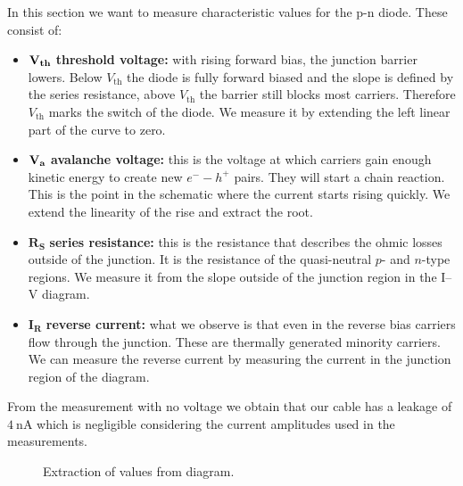 In this section we want to measure characteristic values for the p-n diode. These consist of:

\begin{itemize}
  \item $\mathbf{V_\mathrm{\bf{th}}}$ \textbf{threshold voltage:} with rising forward bias, the junction barrier lowers. Below $V_\mathrm{th}$ the diode is fully forward biased and the slope is defined by the series resistance, above $V_\mathrm{th}$ the barrier still blocks most carriers. Therefore $V_\mathrm{th}$ marks the switch of the diode.
  We measure it by extending the left linear part of the curve to zero.
  \item $\mathbf{V_\mathrm{\bf{a}}}$ \textbf{avalanche voltage:} this is the voltage at which carriers gain enough kinetic energy to create new $e^- - h^+$ pairs. They will start a chain reaction. This is the point in the schematic where the current starts rising quickly. We extend the linearity of the rise and extract the root.

  \item $\mathbf{R_S}$ \textbf{series resistance:} this is the resistance that describes the ohmic losses outside of the junction. It is the resistance of the quasi-neutral $p$- and $n$-type regions. We measure it from the slope outside of the junction region in the I--V diagram.

  \item $\mathbf{I_R}$ \textbf{reverse current:} what we observe is that even in the reverse bias carriers flow through the junction. These are thermally generated minority carriers. We can measure the reverse current by measuring the current in the junction region of the diagram. 
\end{itemize}
From the measurement with no voltage we obtain that our cable has a leakage of $\SI{4}{\nano \A}$ which is negligible considering the current amplitudes used in the measurements.
\begin{figure}[h!]
  \centering
  
  \caption[Extraction of values from diagram]{Extraction of values from diagram.\protect\footnotemark}
  \label{fig:diode}
\end{figure}

